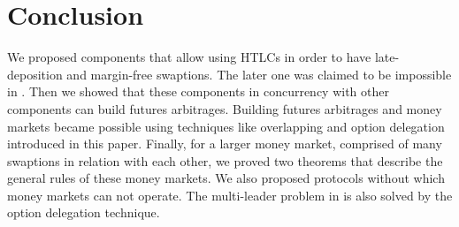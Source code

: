 \section{Conclusion}
\label{sec:conclusion}
We proposed components that allow using HTLCs in order to have late-deposition and margin-free swaptions. The later one was claimed to be impossible in \cite{liu2018atomic}. Then we showed that these components in concurrency with other components can build futures arbitrages. Building futures arbitrages and money markets became possible using techniques like overlapping and option delegation introduced in this paper.
Finally, for a larger money market, comprised of many swaptions in relation with each other, we proved two theorems that describe the general rules of these money markets. We also proposed protocols without which money markets can not operate. The multi-leader problem in \cite{herlihy2018atomic} is also solved by the option delegation technique.
